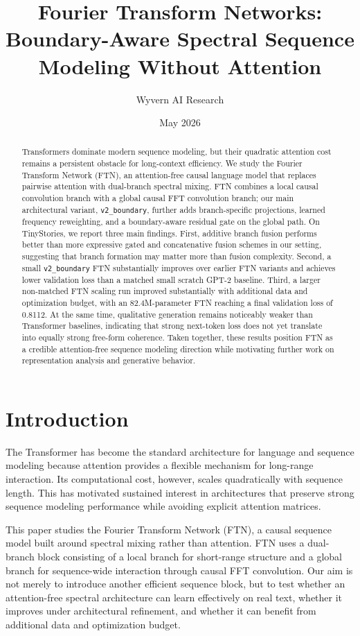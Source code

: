 \documentclass[11pt]{article}
\title{Fourier Transform Networks:\\
Boundary-Aware Spectral Sequence Modeling Without Attention}
\author{Wyvern AI Research}
\date{May 2026}
\begin{document}
\maketitle

\begin{abstract}
Transformers dominate modern sequence modeling, but their quadratic attention cost remains a persistent obstacle for long-context efficiency. We study the Fourier Transform Network (FTN), an attention-free causal language model that replaces pairwise attention with dual-branch spectral mixing. FTN combines a local causal convolution branch with a global causal FFT convolution branch; our main architectural variant, \texttt{v2\_boundary}, further adds branch-specific projections, learned frequency reweighting, and a boundary-aware residual gate on the global path. On TinyStories, we report three main findings. First, additive branch fusion performs better than more expressive gated and concatenative fusion schemes in our setting, suggesting that branch formation may matter more than fusion complexity. Second, a small \texttt{v2\_boundary} FTN substantially improves over earlier FTN variants and achieves lower validation loss than a matched small scratch GPT-2 baseline. Third, a larger non-matched FTN scaling run improved substantially with additional data and optimization budget, with an 82.4M-parameter FTN reaching a final validation loss of 0.8112. At the same time, qualitative generation remains noticeably weaker than Transformer baselines, indicating that strong next-token loss does not yet translate into equally strong free-form coherence. Taken together, these results position FTN as a credible attention-free sequence modeling direction while motivating further work on representation analysis and generative behavior.
\end{abstract}

\section{Introduction}
The Transformer has become the standard architecture for language and sequence modeling because attention provides a flexible mechanism for long-range interaction. Its computational cost, however, scales quadratically with sequence length. This has motivated sustained interest in architectures that preserve strong sequence modeling performance while avoiding explicit attention matrices.

This paper studies the Fourier Transform Network (FTN), a causal sequence model built around spectral mixing rather than attention. FTN uses a dual-branch block consisting of a local branch for short-range structure and a global branch for sequence-wide interaction through causal FFT convolution. Our aim is not merely to introduce another efficient sequence block, but to test whether an attention-free spectral architecture can learn effectively on real text, whether it improves under architectural refinement, and whether it can benefit from additional data and optimization budget.
\end{document}
